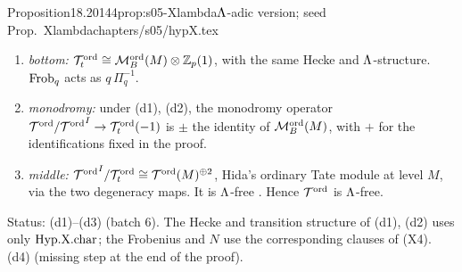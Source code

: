 \begin{quoted}{Proposition}{18.20}{144}{prop:s05-Xlambda}{$\Lam$-adic version; seed Prop.~Xlambda}{chapters/s05/hypX.tex}
\begin{enumerate}[label=(\alph*)]
\begin{enumerate}[label=(d\arabic*)]
    (the Frobenius clauses of (d1), (d2) come from the Frobenius clause of (X4); FD1 is decided (the team, 2026-11-15): the model of $X_s$ is the $\mu_N$-model with Picard functoriality.).
  \item \emph{bottom:} $\mathcal{T}^{\mathrm{ord}}_t\cong\mathcal{M}^{\mathrm{ord}}_B(M)\otimes\mathbb{Z}_p(1)$, with the same Hecke and $\Lam$-structure. $\mathrm{Frob}_q$ acts as $q\,\Pi_q^{-1}$.
  \item \emph{monodromy:} under (d1), (d2), the monodromy operator $\mathcal{T}^{\mathrm{ord}}/{\mathcal{T}^{\mathrm{ord}}}^I\to\mathcal{T}^{\mathrm{ord}}_t(-1)$ is $\pm$ the identity of $\mathcal{M}^{\mathrm{ord}}_B(M)$, with $+$ for the
    identifications fixed in the proof.
  \item \emph{middle:} ${\mathcal{T}^{\mathrm{ord}}}^I/\mathcal{T}^{\mathrm{ord}}_t\cong\mathcal{T}^{\mathrm{ord}}(M)^{\oplus2}$, Hida's ordinary Tate module at level $M$, via the two degeneracy maps.
    It is $\Lam$-free \cite[{Thm.~3.1(ii), p.~562
    ($V^{\rm ord}$ is $\Lam$-free of finite rank), with $J^{\rm ord}_\infty\cong V^{\rm ord}$, p.~596}]{Hi86a}. Hence $\mathcal{T}^{\mathrm{ord}}$ is $\Lam$-free.
  \end{enumerate}
  Status: (d1)--(d3) \stpmc{} (batch 6). The Hecke and transition structure of (d1), (d2) uses only $\mathrm{Hyp.X.char}$; the Frobenius and $N$ use the
  corresponding clauses of (X4). (d4) \stsketch{} (missing step at the end of the proof).
\end{enumerate}
\par\smallskip{}\par

\end{quoted}

